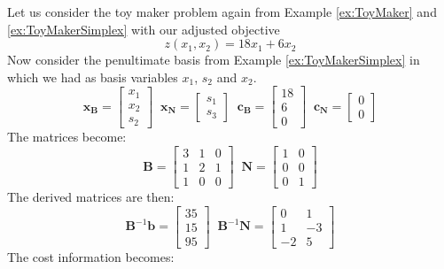 \begin{example}
Let us consider the toy maker problem again from Example \ref{ex:ToyMaker} and \ref{ex:ToyMakerSimplex} with our adjusted objective 
\begin{equation}
z(x_1,x_2) = 18x_1 + 6x_2
\end{equation}
Now consider the penultimate basis from Example \ref{ex:ToyMakerSimplex} in which we had as basis variables $x_1$, $s_2$ and $x_2$. 
\begin{displaymath}
\mathbf{x_B} = \begin{bmatrix}x_1\\x_2\\s_2\end{bmatrix}\;\;
\mathbf{x_N} = \begin{bmatrix}s_1\\s_3\end{bmatrix}\;\;
\mathbf{c_B} = \begin{bmatrix}18\\6\\0\end{bmatrix}\;\;
\mathbf{c_N} = \begin{bmatrix}0\\0\end{bmatrix}
\end{displaymath}
The matrices become:
\begin{displaymath}
\mathbf{B} = \begin{bmatrix}
3 & 1 & 0\\
1 & 2 & 1\\
1 & 0 & 0
\end{bmatrix}\;\;
\mathbf{N} = \begin{bmatrix}
1 & 0\\
0 & 0\\
0 & 1
\end{bmatrix}
\end{displaymath}
The derived matrices are then:
\begin{displaymath}
\mathbf{B}^{-1}\mathbf{b} = \begin{bmatrix}35\\15\\95\end{bmatrix}\;\;
\mathbf{B}^{-1}\mathbf{N} = \begin{bmatrix}
0  & 1\\
1  & -3\\
-2 & 5
\end{bmatrix}
\end{displaymath}
The cost information becomes:

\end{example}
